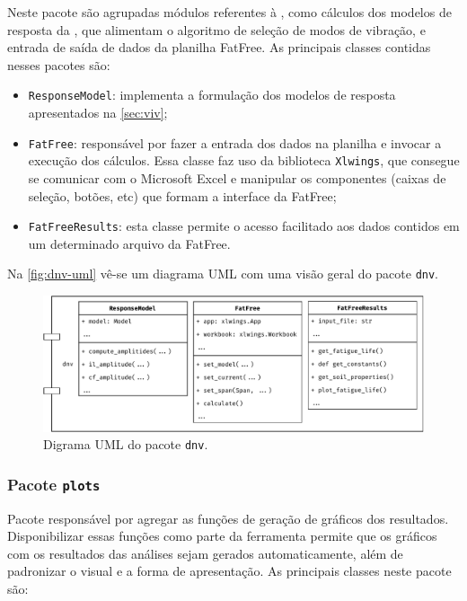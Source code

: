 Neste pacote são agrupadas módulos referentes à , como cálculos dos modelos de resposta da , que alimentam o algoritmo de seleção de modos de vibração, e entrada de saída de dados da planilha FatFree. As principais classes contidas nesses pacotes são:

\begin{itemize}
    \item \texttt{ResponseModel}: implementa a formulação dos modelos de resposta apresentados na \autoref{sec:viv};

    \item \texttt{FatFree}: responsável por fazer a entrada dos dados na planilha e invocar a execução dos cálculos. Essa classe faz uso da biblioteca \texttt{Xlwings}, que consegue se comunicar com o Microsoft Excel e manipular os componentes (caixas de seleção, botões, etc) que formam a interface da FatFree;

    \item \texttt{FatFreeResults}: esta classe permite o acesso facilitado aos dados contidos em um determinado arquivo da FatFree.
\end{itemize}

Na \autoref{fig:dnv-uml} vê-se um diagrama UML com uma visão geral do pacote \texttt{dnv}.

\begin{figure}[!ht]
    \centering
    \caption{Digrama UML do pacote \texttt{dnv}.}\label{fig:dnv-uml}
    \includegraphics[width=\textwidth]{imagens/dnv-uml}
\end{figure}


\subsubsection{Pacote \texttt{plots}}


Pacote responsável por agregar as funções de geração de gráficos dos resultados. Disponibilizar essas funções como parte da ferramenta permite que os gráficos com os resultados das análises sejam gerados automaticamente, além de padronizar o visual e a forma de apresentação. As principais classes neste pacote são:

